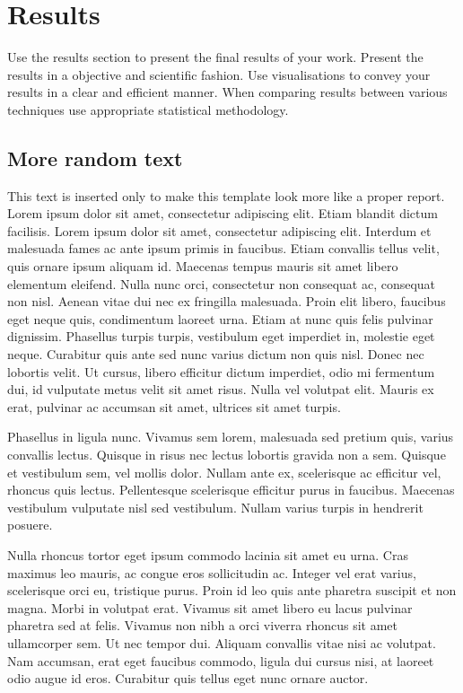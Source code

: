 \documentclass[fleqn,moreauthors,10pt]{ds_report}
\begin{document}
		
		\section*{Results}
		
		Use the results section to present the final results of your work. Present the results in a objective and scientific fashion. Use visualisations to convey your results in a clear and efficient manner. When comparing results between various techniques use appropriate statistical methodology.
		
		\subsection*{More random text}
		
		This text is inserted only to make this template look more like a proper report. Lorem ipsum dolor sit amet, consectetur adipiscing elit. Etiam blandit dictum facilisis. Lorem ipsum dolor sit amet, consectetur adipiscing elit. Interdum et malesuada fames ac ante ipsum primis in faucibus. Etiam convallis tellus velit, quis ornare ipsum aliquam id. Maecenas tempus mauris sit amet libero elementum eleifend. Nulla nunc orci, consectetur non consequat ac, consequat non nisl. Aenean vitae dui nec ex fringilla malesuada. Proin elit libero, faucibus eget neque quis, condimentum laoreet urna. Etiam at nunc quis felis pulvinar dignissim. Phasellus turpis turpis, vestibulum eget imperdiet in, molestie eget neque. Curabitur quis ante sed nunc varius dictum non quis nisl. Donec nec lobortis velit. Ut cursus, libero efficitur dictum imperdiet, odio mi fermentum dui, id vulputate metus velit sit amet risus. Nulla vel volutpat elit. Mauris ex erat, pulvinar ac accumsan sit amet, ultrices sit amet turpis.
		
		Phasellus in ligula nunc. Vivamus sem lorem, malesuada sed pretium quis, varius convallis lectus. Quisque in risus nec lectus lobortis gravida non a sem. Quisque et vestibulum sem, vel mollis dolor. Nullam ante ex, scelerisque ac efficitur vel, rhoncus quis lectus. Pellentesque scelerisque efficitur purus in faucibus. Maecenas vestibulum vulputate nisl sed vestibulum. Nullam varius turpis in hendrerit posuere.
		
		Nulla rhoncus tortor eget ipsum commodo lacinia sit amet eu urna. Cras maximus leo mauris, ac congue eros sollicitudin ac. Integer vel erat varius, scelerisque orci eu, tristique purus. Proin id leo quis ante pharetra suscipit et non magna. Morbi in volutpat erat. Vivamus sit amet libero eu lacus pulvinar pharetra sed at felis. Vivamus non nibh a orci viverra rhoncus sit amet ullamcorper sem. Ut nec tempor dui. Aliquam convallis vitae nisi ac volutpat. Nam accumsan, erat eget faucibus commodo, ligula dui cursus nisi, at laoreet odio augue id eros. Curabitur quis tellus eget nunc ornare auctor.
		
\end{document}
